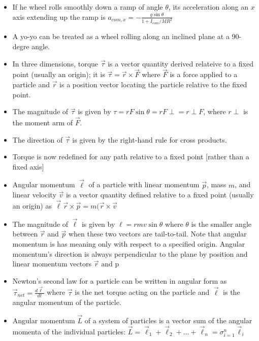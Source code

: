 \documentclass[10pt,letterpaper]{article}
\begin{document}
\begin{itemize}
\item If he wheel rolls smoothly down a ramp of angle $\theta$, its acceleration along an $x$ axis extending up the ramp is $a_{com,x}=-\frac{g \sin\theta}{1+I_{com}/MR^2}$
\item A yo-yo can be treated as a wheel rolling along an inclined plane at a 90-degre angle. %
\item In three dimensions, torque $\vec{\tau}$ is a vector quantity derived relateive to a fixed point (usually an origin); it is $\vec{\tau}=\vec{r}\times\vec{F}$ where $\vec{F}$ is a force applied to a particle and $\vec{r}$ is a position vector locating the particle relative to the fixed point. 
\item The magnitude of $\vec{\tau}$ is given by $\tau=r F \sin \theta=r F \perp=r\perp F$, where $r\perp$ is the moment arm of $\vec{F}$. 
\item The direction of $\vec{\tau}$ is given by the right-hand rule for cross products. 
\item Torque is now redefined for any path relative to a fixed point [rather than a fixed axis]
\item Angular momentum $\vec{\ell}$ of a particle with linear momentum $\vec{p}$, mass $m$, and linear velocity $\vec{v}$ is a vector quantity defined relative to a fixed point (usually an origin) as $\vec{\ell}\vec{r}\times\vec{p}=m(\vec{r}\times\vec{v}$
\item The magnitude of $\vec{\ell}$ is given by $\ell=rmv\sin\theta$ where $\theta$ is the smaller angle between $\vec{r}$ and $\vec{p}$ when these two vectors are tail-to-tail. Note that angular momentum is has meaning only with respect to a specified origin. Angular momentum's direction is always perpendicular to the plane by position and linear momentum vectors $\vec{r} \mbox{ and p}$
\item Newton's second law for a particle can be written in angular form as $\vec{\tau}_{net}=\frac{d\vec{\ell}}{dt}$ where $\vec{\tau}$ is the net torque acting on the particle and $\vec{\ell}$ is the angular momentum of the particle. 
\item Angular momentum $\vec{L}$ of a system of particles is a vector sum of the angular momenta of the individual particles: $\vec{L} =\vec{\ell}_1+\vec{\ell}_2+...+\vec{\ell}_n=\sigma^n_{i=1}\vec{\ell}_i$ 

\end{itemize}
\end{document}
